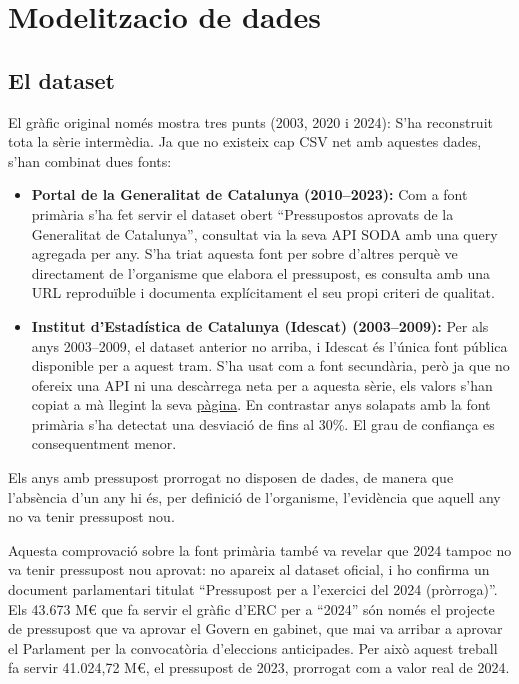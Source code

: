 \documentclass[11pt,a4paper]{article}
\begin{document}
\section{Modelitzacio de dades}

\subsection{El dataset}
El gràfic original només mostra tres punts (2003, 2020 i 2024): S'ha reconstruit tota la sèrie intermèdia. Ja que no
existeix cap CSV net amb aquestes dades, s’han combinat dues fonts:
\begin{itemize}
  \item \textbf{Portal de la Generalitat de Catalunya (2010–2023):} Com a font primària s’ha fet servir el dataset obert “Pressupostos aprovats de la
Generalitat de Catalunya”, consultat via la seva API SODA amb una query agregada per any. S’ha triat aquesta font per sobre d’altres perquè ve directament de l’organisme que elabora el pressupost, es
consulta amb una URL reproduïble i documenta explícitament el seu propi criteri de qualitat.

  \item \textbf{Institut d'Estadística de Catalunya (Idescat) (2003–2009):} Per als anys 2003–2009, el dataset anterior no arriba, i Idescat és l’única font pública disponible per a
aquest tram. S’ha usat com a font secundària, però ja que no ofereix una API ni una descàrrega neta per a aquesta sèrie, els valors s’han copiat a mà
llegint la seva \href{https://www.idescat.cat/indicadors/?id=aec&n=15638}{pàgina}. En contrastar anys solapats amb la font primària s'ha detectat una desviació
de fins al 30\%. El grau de confiança es consequentment menor. 
\end{itemize}

Els anys amb pressupost prorrogat no disposen de dades, de manera
que l’absència d’un any hi és, per definició de l’organisme, l’evidència que aquell any no va tenir
pressupost nou.

Aquesta comprovació sobre la font primària també va revelar que 2024 tampoc no va tenir
pressupost nou aprovat: no apareix al dataset oficial, i ho confirma un document parlamentari
titulat “Pressupost per a l’exercici del 2024 (pròrroga)”. Els 43.673 M€ que fa servir el gràfic d’ERC
per a “2024” són només el projecte de pressupost que va aprovar el Govern en gabinet, que mai va
arribar a aprovar el Parlament per la convocatòria d’eleccions anticipades. Per això aquest treball fa
servir 41.024,72 M€, el pressupost de 2023, prorrogat com a valor real de 2024.
\end{document}
